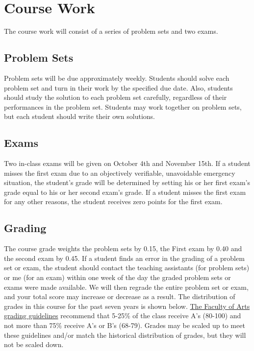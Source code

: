 \documentclass[10pt]{article}
\begin{document}
\section{Course Work}

The course work will consist of a series of problem sets and two
exams. 

\subsection{Problem Sets}
Problem sets will be due approximately weekly.  Students should solve
each problem set and turn in their work by the specified due
date. Also, students should study the solution to each problem set
carefully, regardless of their performances in the problem
set. Students may work together on problem sets, but each student
should write their own solutions.

\subsection{Exams}
Two in-class exams will be given on October 4th and November 15th. If
a student misses the first exam due to an objectively verifiable,
unavoidable emergency situation, the student's grade will be
determined by setting his or her first exam's grade equal to his or her
second exam's grade. If a student misses the first exam for any other
reasons, the student receives zero points for the first exam.

\subsection{Grading}
The course grade weights the problem sets by 0.15, the First exam by
0.40 and the second exam by 0.45. If a student finds an error in the
grading of a problem set or exam, the student should contact the
teaching assistants (for problem sets) or me (for an exam) within one
week of the day the graded problem sets or exams were made
available. We will then regrade the entire problem set or exam, and
your total score may increase or decrease as a result.  The
distribution of grades in this course for the past seven years is shown
below.
\href{http://www.arts.ubc.ca/faculty-amp-staff/resources/courses-and-grading/grading-guidelines.html}
{The Faculty of Arts grading guidelines} recommend that 5-25\% of the
class receive A's (80-100) and not more than 75\% receive A's or B's
(68-79). Grades may be scaled up to meet these guidelines and/or match
the historical distribution of grades, but they will not be scaled
down. 
\end{document}
